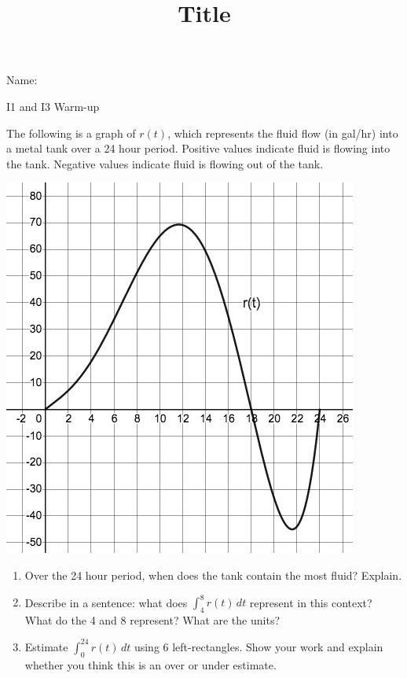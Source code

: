 \documentclass[12pt]{article}
\title{Title}
\begin{document}

 Name:
 \begin{center}\large{I1 and I3 Warm-up}\end{center}

The following is a graph of $r(t)$, which represents the fluid flow (in gal/hr) into a metal tank over a 24 hour period. Positive values indicate fluid is flowing into the tank. Negative values indicate fluid is flowing out of the tank.

\includegraphics [scale=0.4]{I1_rate}


\begin{enumerate}
\item Over the 24 hour period, when does the tank contain the most fluid? Explain.
\vfill
\item Describe in a sentence: what does $\displaystyle \int_4^8 r(t)\,dt$ represent in this context? What do the 4 and 8 represent? What are the units? 
\vfill
\item Estimate $\displaystyle \int_0^{24} r(t)\,dt$ using 6 left-rectangles. Show your work and explain whether you think this is an over or under estimate.
\end{enumerate}
\end{document}
